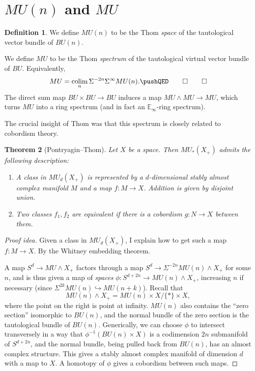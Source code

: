 \documentclass{shortart}
\newtheorem{thm}{Theorem}[section]
\theoremstyle{definition}
\newtheorem{defi}[thm]{Definition}
\DeclareMathOperator*\colim{colim}
\begin{document}
\section{\texorpdfstring{$MU(n)$ and $MU$}{MU(n) and MU}}
\begin{defi}
  We define $MU(n)$ to be the Thom \emph{space} of the tautological vector bundle of $BU(n)$.

  We define $MU$ to be the Thom \emph{spectrum} of the tautological virtual vector bundle of $BU$. Equivalently,
  \[
    MU = \colim_n \Sigma^{-2n} \Sigma^\infty MU(n).\fakeqed
  \]
  The direct sum map $BU \times BU \to BU$ induces a map $MU \wedge MU \to MU$, which turns $MU$ into a ring spectrum (and in fact an $\mathbb{E}_\infty$-ring spectrum).
\end{defi}
The crucial insight of Thom was that this spectrum is closely related to cobordism theory.
\begin{thm}[Pontryagin--Thom]
  Let $X$ be a space. Then $MU_*(X_+)$ admits the following description:
  \begin{enumerate}
    \item A class in $MU_d(X_+)$ is represented by a $d$-dimensional stably almost complex manifold $M$ and a map $f: M \to X$. Addition is given by disjoint union.
    \item Two classes $f_1, f_2$ are equivalent if there is a cobordism $g: N \to X$ between them.
  \end{enumerate}
\end{thm}

\begin{proof}[Proof idea]
  Given a class in $MU_d(X_+)$, I explain how to get such a map $f: M \to X$.  By the Whitney embedding theorem.

  A map $S^d \to MU \wedge X_+$ factors through a map $S^d \to \Sigma^{-2n} MU(n) \wedge X_+$ for some $n$, and is thus given a map of \emph{spaces} $\phi: S^{d + 2n} \to MU(n) \wedge X_+$, increasing $n$ if necessary (since $\Sigma^{2k} MU(n) \hookrightarrow MU(n + k)$). Recall that
  \[
    MU(n) \wedge X_+ = MU(n) \times X / \{*\} \times X,
  \]
  where the point on the right is point at infinity. $MU(n)$ also contains the ``zero section'' isomorphic to $BU(n)$, and the normal bundle of the zero section is the tautological bundle of $BU(n)$. Generically, we can choose $\phi$ to intersect transversely in a way that $\phi^{-1}(BU(n) \times X)$ is a codimension $2n$ submanifold of $S^{d + 2n}$, and the normal bundle, being pulled back from $BU(n)$, has an almost complex structure. This gives a stably almost complex manifold of dimension $d$ with a map to $X$. A homotopy of $\phi$ gives a cobordism between such maps.
\end{proof}
\end{document}
